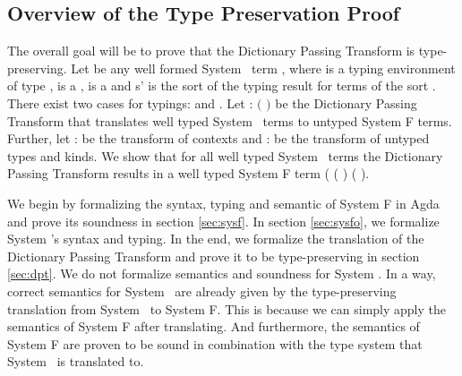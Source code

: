 \subsection{Overview of the Type Preservation Proof}\label{sec:ov}
The overall goal will be to prove that the Dictionary Passing Transform is type-preserving. 
Let  be any well formed System \Fo\ term    \Constr{:} , where  is a typing environment of type ,  is a  ,  is a   and s' is the sort of the typing result for terms of the sort . 
There exist two cases for typings:    \Constr{:}  and    \Constr{:} .
Let  : $($   \Constr{:} $)$    be the Dictionary Passing Transform that translates well typed System \Fo\ terms to untyped System F terms. 
Further, let  :    be the transform of contexts and  :      be the transform of untyped types and kinds. 
We show that for all well typed System \Fo\  terms  the Dictionary Passing Transform results in a well typed System F term (   ( ) \Constr{:} ( ). 

\noindent We begin by formalizing the syntax, typing and semantic of System F in Agda and prove its soundness in section \ref{sec:sysf}. 
In section \ref{sec:sysfo}, we formalize System \Fo's syntax and typing. 
In the end, we formalize the translation of the Dictionary Passing Transform and prove it to be type-preserving in section \ref{sec:dpt}. 
We do not formalize semantics and soundness for System \Fo. 
In a way, correct semantics for System \Fo\ are already given by the type-preserving translation from System \Fo\ to System F. 
This is because we can simply apply the semantics of System F after translating. 
And furthermore, the semantics of System F are proven to be sound in combination with the type system that System \Fo\ is translated to.